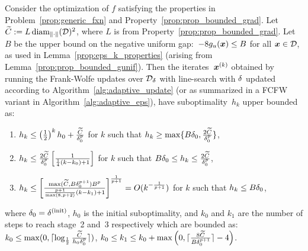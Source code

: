 \begin{theorem}
	\label{thm:convergence_adaptive_eps}
	Consider the optimization of $f$ satisfying the properties in Problem~\ref{prop:generic_fxn} and Property~\ref{prop:prop_bounded_grad}.  Let~$\widetilde{C} := L \operatorname{diam}_{\|\cdot\|}(\mathcal{D})^2$, where $L$ is from Property~\ref{prop:prop_bounded_grad}. Let~$B$ be the upper bound on the negative uniform gap:~$-8g_u(\bm{x})\leq B$ for all $\bm{x} \in \mathcal{D}$, as used in Lemma~\ref{prop:eps_k_properties} (arising from Lemma~\ref{prop:prop_bounded_gunif}). Then the iterates~$\bm{x}^{(k)}$ obtained by running the Frank-Wolfe updates over $\mathcal{D}_{\delta}$ with line-search with $\delta$ updated according to Algorithm~\ref{alg:adaptive_update} (or as summarized in a FCFW variant in Algorithm~\ref{alg:adaptive_eps}), have suboptimality~$h_k$ upper bounded as:
	\begin{enumerate}
		\item $h_k\leq \left(\frac{1}{2}\right)^{k}h_{0} +\frac{\widetilde{C}}{\delta_0^p}$ for $k$ such that $h_k \geq \max\{ B\delta_0, \frac{2\widetilde{C}}{\delta_0^p}\}$, \\
		\item $h_k\leq\frac{2\widetilde{C}}{\delta_0^p}\left[\frac{1}{\frac{1}{4} (k-k_0)+1}\right]$ for $k$ such that $B\delta_0\leq h_k\leq\frac{2\widetilde{C}}{\delta_0^p}$,\\
		\item $h_k\leq \left[\frac{\max(\widetilde{C},B\delta_0^{p+1})B^p}{\frac{p+1}{\max(8,p+2)}(k-k_1)+1}\right]^{\frac{1}{p+1}} = O(k^{-\frac{1}{p+1}})$ for $k$ such that $h_k\leq B\delta_0$,\\
	\end{enumerate}
	where $\delta_0 = \delta^{(\mathrm{init})}$, $h_0$ is the initial suboptimality, and $k_0$ and $k_1$ are the number of steps to reach stage~2 and~3 respectively which are bounded as: $k_0\leq \max(0,  \lceil\log_{\frac{1}{2}}\frac{\widetilde{C}}{ h_0 \delta_0^p}\rceil )$, 
	$k_0 \leq k_1\leq k_0 + \max\left(0,\lceil \frac{8\widetilde{C}}{B\delta_0^{p+1}}\rceil -4\right)$.
	
\end{theorem}
